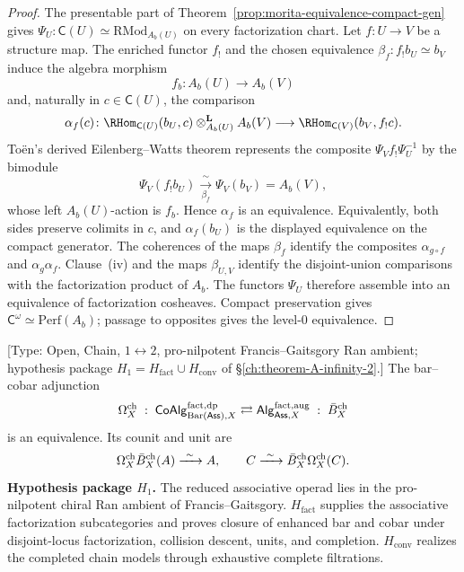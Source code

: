 \begin{proof}
The presentable part of
Theorem~\ref{prop:morita-equivalence-compact-gen} gives
$\Psi_U\colon\mathsf C(U)\simeq\mathrm{RMod}_{A_b(U)}$ on every
factorization chart.  Let $f\colon U\to V$ be a structure map.  The
enriched functor $f_!$ and the chosen equivalence
$\beta_f\colon f_!b_U\simeq b_V$ induce the algebra morphism
\[
 f_b\colon A_b(U)\longrightarrow A_b(V)
\]
and, naturally in $c\in\mathsf C(U)$, the comparison
\[
 \alpha_f(c)\colon
 \RHom_{\mathsf C(U)}(b_U,c)
 \otimes^{\mathbf L}_{A_b(U)}A_b(V)
 \longrightarrow
 \RHom_{\mathsf C(V)}(b_V,f_!c).
\]
To\"en's derived Eilenberg--Watts theorem
\cite[Theorem~7.2 and Corollary~7.6]{Toen07} represents the composite
$\Psi_Vf_!\Psi_U^{-1}$ by the bimodule
\[
 \Psi_V(f_!b_U)
 \xrightarrow[\beta_f]{\ \sim\ }
 \Psi_V(b_V)=A_b(V),
\]
whose left $A_b(U)$-action is $f_b$.  Hence $\alpha_f$ is an
equivalence.  Equivalently, both sides preserve colimits in $c$, and
$\alpha_f(b_U)$ is the displayed equivalence on the compact generator.
The coherences of the maps $\beta_f$ identify the composites
$\alpha_{g\circ f}$ and $\alpha_g\alpha_f$.  Clause~\textup{(iv)} and
the maps $\beta_{U,V}$ identify the disjoint-union comparisons with
the factorization product of $A_b$.  The functors $\Psi_U$ therefore
assemble into an equivalence of factorization cosheaves.  Compact
preservation gives
$\mathsf C^\omega\simeq\mathrm{Perf}(A_b)$; passage to opposites gives
the level-$0$ equivalence.
\end{proof}

\begin{theorem}
\label{thm:mr-A}
\textup{[Type: Open, Chain, $1\leftrightarrow 2$, pro-nilpotent
Francis--Gaitsgory Ran ambient; hypothesis package
$H_1=H_{\mathrm{fact}}\cup H_{\mathrm{conv}}$ of
\S\ref{ch:theorem-A-infinity-2}.]}
The bar--cobar adjunction
\[
 \Omega^{\mathrm{ch}}_X\;:\;
 \mathsf{CoAlg}^{\mathrm{fact},\mathrm{dp}}_{\operatorname{Bar}(\mathsf{Ass}),X}
 \rightleftarrows
 \mathsf{Alg}^{\mathrm{fact},\mathrm{aug}}_{\mathsf{Ass},X}\;:\;\bar{B}^{\mathrm{ch}}_X
\]
is an equivalence.  Its counit and unit are
\[
 \Omega^{\mathrm{ch}}_X\bar{B}^{\mathrm{ch}}_X(A)\xrightarrow{\ \sim\ }A,
 \qquad
 C\xrightarrow{\ \sim\ }\bar{B}^{\mathrm{ch}}_X\Omega^{\mathrm{ch}}_X(C).
\]
\textbf{Hypothesis package $H_1$.}
The reduced associative operad lies in the pro-nilpotent chiral Ran
ambient of Francis--Gaitsgory.  $H_{\mathrm{fact}}$ supplies the
associative factorization subcategories and proves closure of enhanced
bar and cobar under disjoint-locus factorization, collision descent,
units, and completion.  $H_{\mathrm{conv}}$ realizes the completed
chain models through exhaustive complete filtrations.
\end{theorem}


